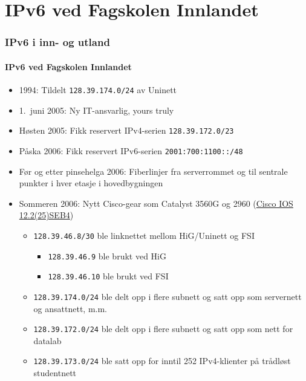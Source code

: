 \section{IPv6 ved Fagskolen Innlandet}
\begin{frame}%
  \frametitle{IPv6 i inn- og utland}
  \framesubtitle{IPv6 ved Fagskolen Innlandet}
  \begin{itemize}%
  \item 1994: Tildelt \texttt{128.39.174.0/24} av Uninett
  \item 1.~juni 2005: Ny IT-ansvarlig, yours truly
  \item Høsten 2005: Fikk reservert IPv4-serien
    \texttt{128.39.172.0/23}
  \item Påska 2006: Fikk reservert IPv6-serien
    \texttt{2001:700:1100::/48}
  \item Før og etter pinsehelga 2006: Fiberlinjer fra serverrommet og
    til sentrale punkter i hver etasje i hovedbygningen
  \item Sommeren 2006: Nytt Cisco-gear som Catalyst 3560G og 2960
    (\href{http://www.cisco.com/en/US/docs/switches/lan/catalyst3560/software/release/12.2_25_seb/release/notes/OL7189.html}{Cisco
      IOS 12.2(25)SEB4})
    \begin{itemize}%
    \item \texttt{128.39.46.8/30} ble linknettet mellom HiG/Uninett og
      FSI
      \begin{itemize}%
      \item \texttt{128.39.46.9\phantom{0}} ble brukt ved HiG
      \item \texttt{128.39.46.10} ble brukt ved FSI
      \end{itemize}
    \item \texttt{128.39.174.0/24} ble delt opp i flere subnett og
      satt opp som servernett og ansattnett, m.m.
    \item \texttt{128.39.172.0/24} ble delt opp i flere subnett og
      satt opp som nett for datalab
    \item \texttt{128.39.173.0/24} ble satt opp for inntil 252
      IPv4-klienter på trådløst studentnett
    \end{itemize}
  \end{itemize}
\end{frame}

